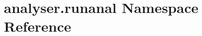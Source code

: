 \hypertarget{namespaceanalyser_1_1runanal}{\section{analyser.\-runanal Namespace Reference}
\label{namespaceanalyser_1_1runanal}
}
